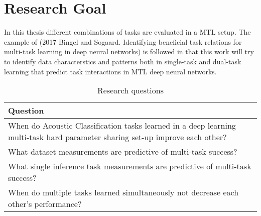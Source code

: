 \chapter{Research Goal}
	In this thesis different combinations of tasks are evaluated in a MTL setup. The example of (2017 Bingel and Sogaard. Identifying beneficial task relations for multi-task learning in deep neural networks) is followed in that this work will try to identify data characterstics and patterns both in single-task and dual-task learning that predict task interactions in MTL deep neural networks. 
	
	\begin{table}[ht]
		\caption{Research questions} %
		\centering %
		\begin{tabular}{p{\textwidth}} %
			\hline\hline %
			Question \\ [0.5ex] %
			\hline %
			When do Acoustic Classification tasks learned in a deep learning multi-task hard parameter sharing set-up improve each other? \\ %
			What dataset measurements are predictive of multi-task success? \\
			What single inference task measurements are predictive of multi-task success? \\
			When do multiple tasks learned simultaneously not decrease each other’s performance? \\ [1ex] %
			\hline %
		\end{tabular}
		\label{table:questions} %
	\end{table}

	